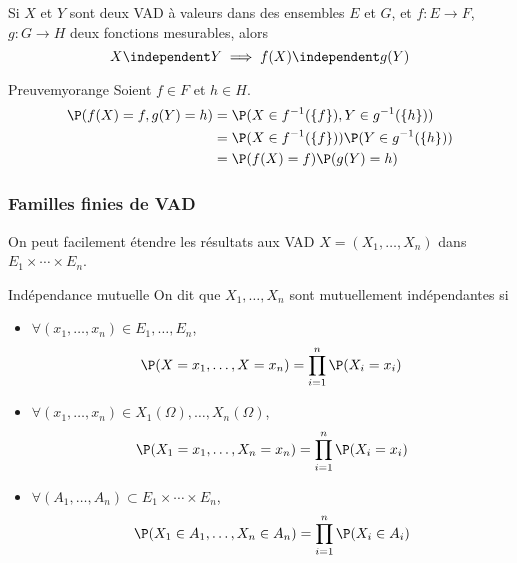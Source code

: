     \begin{coro}{}{}
        Si $X$ et $Y$ sont deux VAD à valeurs dans des ensembles $E$ et $G$, et $f : E \to F$, $g : G \to H$ deux fonctions mesurables, alors 
        \[ X \independent Y \implies f(X) \independent g(Y) \]   
    \end{coro}

    \begin{omed}{Preuve}{myorange}
        Soient $f \in F$ et $h \in H$.
        \begin{align*}
            \P(f(X) = f, g(Y) = h) &= \P(X \in f^{-1}(\left\{f\right\}), Y \in g^{-1}(\left\{h\right\})) \\
            &= \P(X \in f^{-1}(\left\{f\right\}))\P(Y \in g^{-1}(\left\{h\right\})) \\
            &= \P(f(X) = f) \P(g(Y) = h)
        \end{align*}
    \end{omed}

    \subsubsection{Familles finies de VAD}

    On peut facilement étendre les résultats aux VAD $X = (X_1,\ldots,X_n)$ dans $E_1 \times \cdots \times E_n$.

    \begin{defitheo}{Indépendance mutuelle}{}
        On dit que $X_1, \ldots, X_n$ sont mutuellement indépendantes si 
        \begin{itemize}
            \item $\forall (x_1,\ldots,x_n) \in E_1, \ldots, E_n$,
            \[ \P(X = x_1,\ldots,X=x_n) = \prod_{i =1}^n \P(X_i = x_i) \]  
            \item $\forall (x_1,\ldots,x_n) \in X_1(\Omega), \ldots, X_n(\Omega)$, 
            \[ \P(X_1 = x_1,\ldots,X_n=x_n) = \prod_{i =1}^n \P(X_i = x_i) \]  
            \item $\forall (A_1,\ldots,A_n) \subset E_1 \times \cdots \times E_n$, 
            \[ \P(X_1 \in A_1, \ldots, X_n \in A_n) = \prod_{i = 1}^n \P(X_i \in A_i) \]   
        \end{itemize}
    \end{defitheo}


